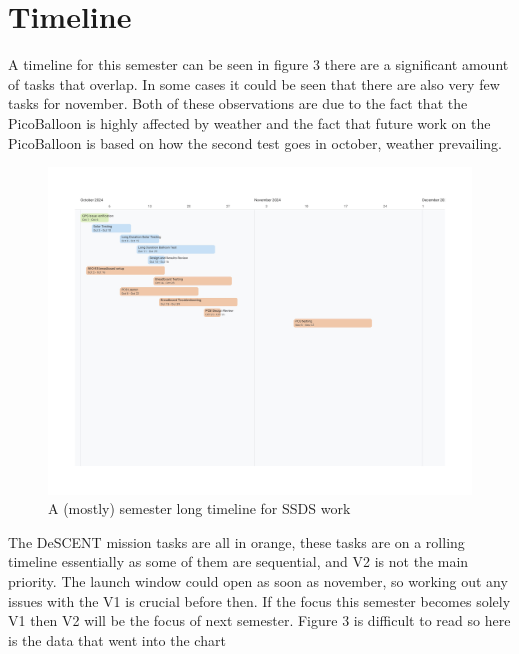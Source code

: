 \section{Timeline}
A timeline for this semester can be seen in figure 3 there are a significant amount of tasks that overlap. In some cases it could be seen that there are also very few tasks for november. Both of these observations are due to the fact that the PicoBalloon is highly affected by weather and the fact that future work on the PicoBalloon is based on how the second test goes in october, weather prevailing.
\begin{figure}[H]
    \begin{center}
            \includegraphics[width=1\textwidth]{Images/SSDS Timeline.jpg}\caption{A (mostly) semester long timeline for SSDS work}
    \end{center}
\end{figure}
The DeSCENT mission tasks are all in orange, these tasks are on a rolling timeline essentially as some of them are sequential, and V2 is not the main priority. The launch window could open as soon as november, so working out any issues with the V1 is crucial  before then. If the focus this semester becomes solely V1 then V2 will be the focus of next semester. Figure 3 is difficult to read so here is the data that went into the chart

